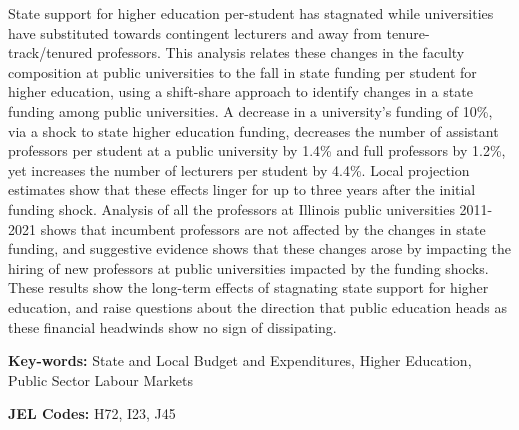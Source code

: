\noindent
State support for higher education per-student has stagnated while universities have substituted towards contingent lecturers and away from tenure-track/tenured professors.
This analysis relates these changes in the faculty composition at public universities to the fall in state funding per student for higher education, using a shift-share approach to identify changes in a state funding among public universities.
A decrease in a university's funding of 10\%, via a shock to state higher education funding, decreases the number of assistant professors per student at a public university by 1.4\% and full professors by 1.2\%, yet increases the number of lecturers per student by 4.4\%.
Local projection estimates show that these effects linger for up to three years after the initial funding shock.
Analysis of all the professors at Illinois public universities 2011-2021 shows that incumbent professors are not affected by the changes in state funding, and suggestive evidence shows that these changes arose by impacting the hiring of new professors at public universities impacted by the funding shocks.
These results show the long-term effects of stagnating state support for higher education, and raise questions about the direction that public education heads as these financial headwinds show no sign of dissipating.

\vfill
\noindent
\textbf{Key-words:}
State and Local Budget and Expenditures,
Higher Education,
Public Sector Labour Markets

\vspace{0.1cm}
\noindent
\textbf{JEL Codes:} H72, I23, J45
